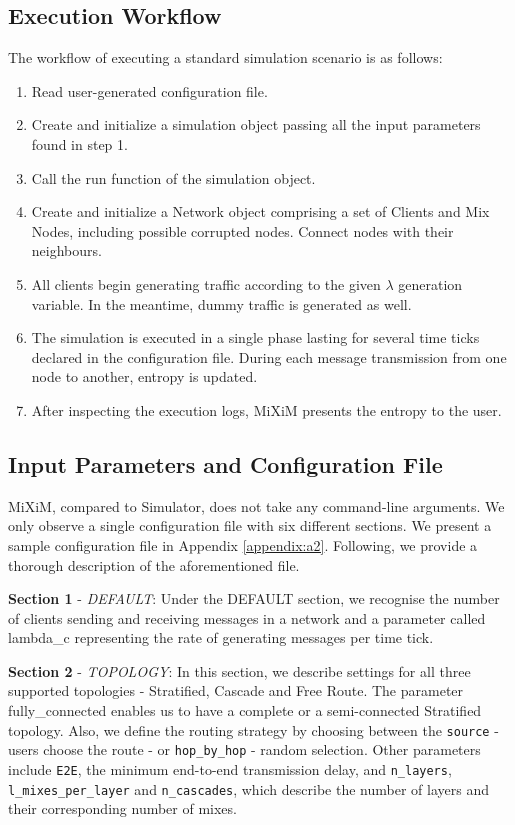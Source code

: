\documentclass[logo,msc,cyber]{infthesis}   %
\begin{document}
\subsection{Execution Workflow}

The workflow of executing a standard simulation scenario is as follows:

\begin{enumerate}
    \item Read user-generated configuration file.
    \item Create and initialize a simulation object passing all the input
    parameters found in step 1.
    \item Call the run function of the simulation object.
    \item Create and initialize a Network object comprising a set of Clients and
    Mix Nodes, including possible corrupted nodes. Connect nodes with their
    neighbours.
    \item All clients begin generating traffic according to the given $\lambda$
    generation variable. In the meantime, dummy traffic is generated as well.
    \item The simulation is executed in a single phase lasting for several time
    ticks declared in the configuration file. During each message transmission
    from one node to another, entropy is updated.
    \item After inspecting the execution logs, MiXiM presents the entropy to the user.
\end{enumerate}

\subsection{Input Parameters and Configuration File}

MiXiM, compared to Simulator, does not take any command-line arguments. We only
observe a single configuration file with six different sections. We present a
sample configuration file in Appendix \ref{appendix:a2}. Following, we provide a thorough
description of the aforementioned file.

\textbf{Section 1} - \emph{DEFAULT}: Under the DEFAULT section, we recognise
the number of clients sending and receiving messages in a network and a
parameter called lambda\_c representing the rate of generating messages per time
tick. 

\textbf{Section 2} - \emph{TOPOLOGY}: In this section, we describe settings for
all three supported topologies - Stratified, Cascade and Free Route. The
parameter fully\_connected enables us to have a complete or a semi-connected
Stratified topology. Also, we define the routing strategy by choosing between
the \texttt{source} - users choose the route - or \texttt{hop\_by\_hop} - random
selection. Other parameters include \texttt{E2E}, the minimum end-to-end
transmission delay, and \texttt{n\_layers}, \texttt{l\_mixes\_per\_layer} and
\texttt{n\_cascades}, which describe the number of layers and their
corresponding number of mixes.
\end{document}
